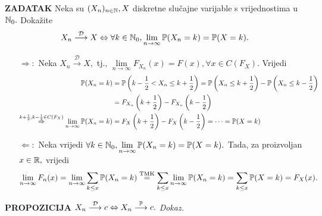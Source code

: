 \documentclass{article}
\begin{document}
\textbf{ZADATAK}\newline 
Neka su \((X_n)_{n\in\Bbb N},X\) diskretne slučajne varijable s vrijednostima u \(\Bbb N_0.\) Dokažite \[X_n\overset{\mathcal D}{\longrightarrow}X\Leftrightarrow\forall k\in\Bbb N_0,\lim_{n\to\infty}\Bbb P(X_n=k)=\Bbb P(X=k).\]
\begin{itemize}
    \item[\(\boxed{\Rightarrow}:\)] Neka \(X_n\overset{\mathcal D}{\longrightarrow}X,\) tj., \(\lim\limits_{n\to\infty}F_{X_n}(x)=F(x),\forall x\in C(F_X).\) Vrijedi \[\begin{aligned}\Bbb P(X_n=k)&=\Bbb P\left(k-\frac12<X_n\le k+\frac12\right)=\Bbb P\left(X_n\le k+\frac12\right)-\Bbb P\left(X_n\le k-\frac12\right)\\&=F_{X_n}\left(k+\frac12\right)-F_{X_n}\left(k-\frac12\right)\\\overset{k+\frac12,k-\frac12\in C(F_X)}{\Rightarrow}\lim_{n\to\infty}\Bbb P(X_n=k)&=F_X\left(k+\frac12\right)-F_X\left(k-\frac12\right)=\cdots=\Bbb P(X=k)\end{aligned}\]
    \item[\(\boxed{\Leftarrow}:\)] Neka vrijedi \(\forall k\in\Bbb N_0,\lim\limits_{n\to\infty}\Bbb P(X_n=k)=\Bbb P(X=k).\) Tada, za proizvoljan \(x\in\Bbb R,\) vrijedi \[\lim_{n\to\infty}F_n(x)=\lim_{n\to\infty}\sum_{k\le x}\Bbb P(X_n=k)\overset{\text{TMK}}{=}\sum_{k\le x}\lim_{n\to\infty}\Bbb P(X_n=k)=\sum_{k\le x}\Bbb P(X=k)=F_X(x).\]
\end{itemize}
\textbf{PROPOZICIJA}\newline
\(X_n\overset{\mathcal D}{\longrightarrow}c\Leftrightarrow X_n\overset{\Bbb P}{\longrightarrow}c.\)\newline\newline
\textit{Dokaz.}
\end{document}
